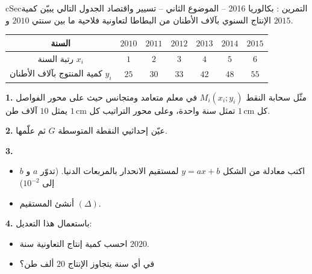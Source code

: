 \documentclass[12pt,a4paper]{article}
\newenvironment{BOX}[2]{\begin{otherlanguage}{english}\begin{arbox}{#1}{#2}}{\end{arbox}\end{otherlanguage}}
\newcounter{exo}
\newenvironment{tamrin}[1]{\stepcounter{exo}\begin{BOX}{cSec}{التمرين \theexo: #1}}{\end{BOX}}
\newenvironment{sq}{\begin{itemize}[leftmargin=2.4em,itemsep=3pt]}{\end{itemize}}
\newcommand{\qa}{\item[(أ)]}\newcommand{\qb}{\item[(ب)]}\newcommand{\qc}{\item[(جـ)]}\newcommand{\qd}{\item[(د)]}\newcommand{\qe}{\item[(هـ)]}
\newcommand{\QQ}[1]{\par\smallskip\textbf{#1.} }
\begin{document}
\begin{tamrin}{بكالوريا 2016 -- الموضوع الثاني -- تسيير واقتصاد}
الجدول التالي يبيّن كمية الإنتاج السنوي بآلاف الأطنان من البطاطا لتعاونية فلاحية ما بين سنتي $2010$ و $2015$.
\begin{center}
\begin{tabular}{|C|c|c|c|c|c|c|}\hline
{} السنة & $2010$ & $2011$ & $2012$ & $2013$ & $2014$ & $2015$\\\hline
رتبة السنة $x_i$ & $1$ & $2$ & $3$ & $4$ & $5$ & $6$\\\hline
كمية المنتوج بآلاف الأطنان $y_i$ & $25$ & $30$ & $33$ & $42$ & $48$ & $55$\\\hline
\end{tabular}
\end{center}

\QQ{1} مثّل سحابة النقط $M_i(x_i;y_i)$ في معلم متعامد ومتجانس حيث على محور الفواصل كل $1\,\text{cm}$ تمثل سنة واحدة، وعلى محور التراتيب كل $1\,\text{cm}$ يمثل $10$ آلاف طن.
\QQ{2} عيّن إحداثيي النقطة المتوسطة $G$ ثم علّمها.
\QQ{3}
\begin{sq}
\qa اكتب معادلة من الشكل $y=ax+b$ لمستقيم الانحدار بالمربعات الدنيا. (تدوّر $a$ و $b$ إلى $10^{-2}$)
\qb أنشئ المستقيم $(\Delta)$.
\end{sq}
\QQ{4} باستعمال هذا التعديل:
\begin{itemize}
\item احسب كمية إنتاج التعاونية سنة $2020$.
\item في أي سنة يتجاوز الإنتاج $20$ ألف طن؟
\end{itemize}
\end{tamrin}
\end{document}
